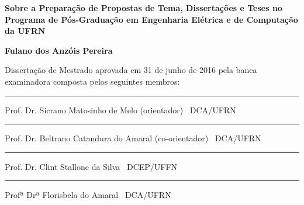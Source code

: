%
%

\begin{titlepage}

\begin{center}

\LARGE

\textbf{Sobre a Preparação de Propostas de Tema, Dissertações
e Teses no Programa de Pós-Graduação em Engenharia Elétrica e de Computação da UFRN}

\vfill

\Large

\textbf{Fulano dos Anzóis Pereira}

\end{center}

\vfill

\noindent
Dissertação de Mestrado
aprovada em 31 de junho de 2016 pela banca examinadora composta
pelos seguintes membros:


\begin{center}

\vspace{1.5cm}\rule{0.95\linewidth}{1pt}
\parbox{0.9\linewidth}{%
Prof. Dr. Sicrano Matosinho de Melo (orientador) \dotfill\ DCA/UFRN}

\vspace{1.5cm}\rule{0.95\linewidth}{1pt}
\parbox{0.9\linewidth}{%
Prof. Dr. Beltrano Catandura do Amaral (co-orientador) \dotfill\ DCA/UFRN}

\vspace{1.5cm}\rule{0.95\linewidth}{1pt}
\parbox{0.9\linewidth}{%
Prof. Dr. Clint Stallone da Silva \dotfill\ DCEP/UFFN}

\vspace{1.5cm}\rule{0.95\linewidth}{1pt}
\parbox{0.9\linewidth}{%
Profª Drª Florisbela do Amaral \dotfill\ DCA/UFRN}

\end{center}

\end{titlepage}

